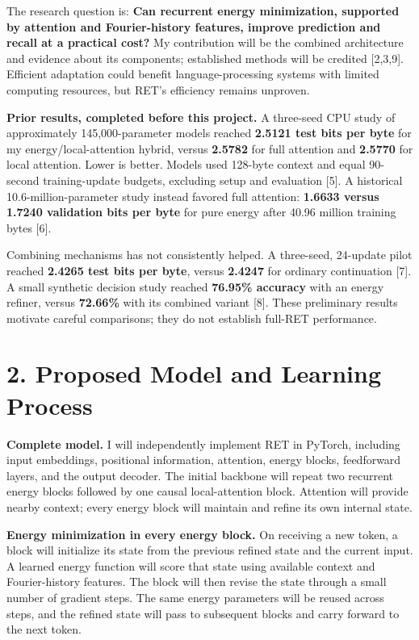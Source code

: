 \documentclass[11pt,letterpaper]{article}
\begin{document}
The research question is: \textbf{Can recurrent energy minimization, supported by attention and Fourier-history features, improve prediction and recall at a practical cost?} My contribution will be the combined architecture and evidence about its components; established methods will be credited [2,3,9]. Efficient adaptation could benefit language-processing systems with limited computing resources, but RET's efficiency remains unproven.

\textbf{Prior results, completed before this project.} A three-seed CPU study of approximately 145,000-parameter models reached \textbf{2.5121 test bits per byte} for my energy/local-attention hybrid, versus \textbf{2.5782} for full attention and \textbf{2.5770} for local attention. Lower is better. Models used 128-byte context and equal 90-second training-update budgets, excluding setup and evaluation [5]. A historical 10.6-million-parameter study instead favored full attention: \textbf{1.6633 versus 1.7240 validation bits per byte} for pure energy after 40.96 million training bytes [6].

Combining mechanisms has not consistently helped. A three-seed, 24-update pilot reached \textbf{2.4265 test bits per byte}, versus \textbf{2.4247} for ordinary continuation [7]. A small synthetic decision study reached \textbf{76.95\% accuracy} with an energy refiner, versus \textbf{72.66\%} with its combined variant [8]. These preliminary results motivate careful comparisons; they do not establish full-RET performance.

\newpage
\section*{2. Proposed Model and Learning Process}

\textbf{Complete model.} I will independently implement RET in PyTorch, including input embeddings, positional information, attention, energy blocks, feedforward layers, and the output decoder. The initial backbone will repeat two recurrent energy blocks followed by one causal local-attention block. Attention will provide nearby context; every energy block will maintain and refine its own internal state.

\textbf{Energy minimization in every energy block.} On receiving a new token, a block will initialize its state from the previous refined state and the current input. A learned energy function will score that state using available context and Fourier-history features. The block will then revise the state through a small number of gradient steps. The same energy parameters will be reused across steps, and the refined state will pass to subsequent blocks and carry forward to the next token.
\end{document}
